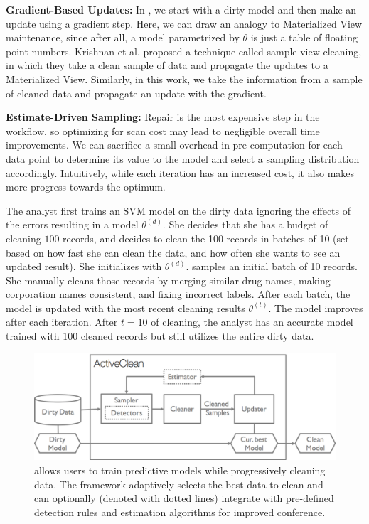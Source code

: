   \vspace{0.5em}

  \noindent\textbf{Gradient-Based Updates: } In \sys, we start with a dirty model and then make an update using a gradient step. Here, we can draw an analogy to Materialized View maintenance, since after all, a model parametrized by $\theta$ is just a table of floating point numbers.
  Krishnan et al. proposed a technique called sample view cleaning, in which they take a clean sample of data and propagate the updates to a Materialized View.
  Similarly, in this work, we take the information from a sample of cleaned data and propagate an update with the gradient.

  \vspace{0.5em}

  \noindent\textbf{Estimate-Driven Sampling: } Repair is the most expensive step in the workflow, so optimizing for scan cost may lead to negligible overall time improvements.
  We can sacrifice a small overhead in pre-computation for each data point to determine its value to the model and select a sampling distribution accordingly.
  Intuitively, while each iteration has an increased cost, it also makes more progress towards the optimum.


  \begin{example}

  The analyst first trains an SVM model on the dirty data ignoring the effects of the errors resulting in a model $\theta^{(d)}$.
  She decides that she has a budget of cleaning $100$ records, and decides to clean the 100 records in batches of 10 (set based on how fast she can clean the data, and how often she wants to see an updated result).
  She initializes \sys with $\theta^{(d)}$.
  \sys samples an initial batch of 10 records.
  She manually cleans those records by merging similar drug names, making corporation names consistent, and fixing incorrect labels.
  After each batch, the model is updated with the most recent cleaning results $\theta^{(t)}$.
  The model improves after each iteration.
  After $t=10$ of cleaning, the analyst has an accurate model trained with 100 cleaned records but still utilizes the entire dirty data.
  \end{example}
\fi

\begin{figure}[t]
\centering
 \includegraphics[width=\columnwidth]{figs/arch.png}
 \caption{\sysfull allows users to train predictive models while progressively cleaning data. The framework adaptively selects the best data to clean and can optionally (denoted with dotted lines) integrate with pre-defined detection rules and estimation algorithms for improved conference. \label{sys-arch}}
\end{figure}


